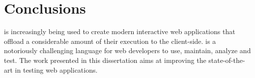 \chapter{Conclusions} \label{Chap:conc}
\javascript is increasingly being used to create modern interactive web applications that offload a considerable amount of their execution to the client-side. \javascript is a notoriously challenging language for web developers to use, maintain, analyze and test. %
The work presented in this dissertation aims at improving the state-of-the-art in testing \javascript web applications.
